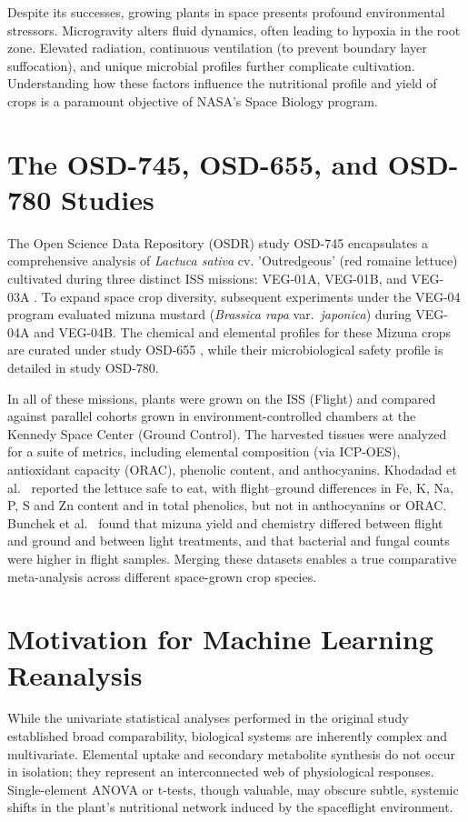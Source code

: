 Despite its successes, growing plants in space presents profound environmental stressors. Microgravity alters fluid dynamics, often leading to hypoxia in the root zone. Elevated radiation, continuous ventilation (to prevent boundary layer suffocation), and unique microbial profiles further complicate cultivation. Understanding how these factors influence the nutritional profile and yield of crops is a paramount objective of NASA's Space Biology program.

\section{The OSD-745, OSD-655, and OSD-780 Studies}
The Open Science Data Repository (OSDR) study OSD-745 encapsulates a comprehensive analysis of \textit{Lactuca sativa} cv. 'Outredgeous' (red romaine lettuce) cultivated during three distinct ISS missions: VEG-01A, VEG-01B, and VEG-03A \cite{khodadad2020}. To expand space crop diversity, subsequent experiments under the VEG-04 program evaluated mizuna mustard (\textit{Brassica rapa} var.\ \textit{japonica}) during VEG-04A and VEG-04B. The chemical and elemental profiles for these Mizuna crops are curated under study OSD-655 \cite{bunchek2024}, while their microbiological safety profile is detailed in study OSD-780.

In all of these missions, plants were grown on the ISS (Flight) and compared against parallel cohorts grown in environment-controlled chambers at the Kennedy Space Center (Ground Control). The harvested tissues were analyzed for a suite of metrics, including elemental composition (via ICP-OES), antioxidant capacity (ORAC), phenolic content, and anthocyanins. Khodadad et al.\ \cite{khodadad2020} reported the lettuce safe to eat, with flight--ground differences in Fe, K, Na, P, S and Zn content and in total phenolics, but not in anthocyanins or ORAC. Bunchek et al.\ \cite{bunchek2024} found that mizuna yield and chemistry differed between flight and ground and between light treatments, and that bacterial and fungal counts were higher in flight samples. Merging these datasets enables a true comparative meta-analysis across different space-grown crop species.

\section{Motivation for Machine Learning Reanalysis}
While the univariate statistical analyses performed in the original study established broad comparability, biological systems are inherently complex and multivariate. Elemental uptake and secondary metabolite synthesis do not occur in isolation; they represent an interconnected web of physiological responses. Single-element ANOVA or t-tests, though valuable, may obscure subtle, systemic shifts in the plant's nutritional network induced by the spaceflight environment.

